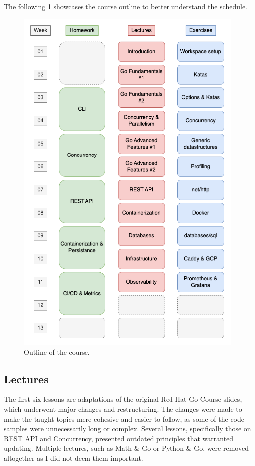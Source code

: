 \documentclass[
  digital,
  color,
  oneside,
  nosansbold,
  nocolorbold,
  nolof,
  nolot,
]{fithesis4}
\begin{document}
The following \cref{schedule-outline} showcases the course outline to better understand the schedule.

\begin{figure}[H]
    \centering
    \includegraphics[width=11cm]{figures/schedule.png}
    \caption{Outline of the course.}
    \label{schedule-outline}
\end{figure}

\subsection{Lectures}

The first six lessons are adaptations of the original Red Hat Go Course slides, which underwent major changes and restructuring. The changes were made to make the taught topics more cohesive and easier to follow, as some of the code samples were unnecessarily long or complex. Several lessons, specifically those on REST API and Concurrency, presented outdated principles that warranted updating. Multiple lectures, such as Math \& Go or Python \& Go, were removed altogether as I did not deem them important.
\end{document}
